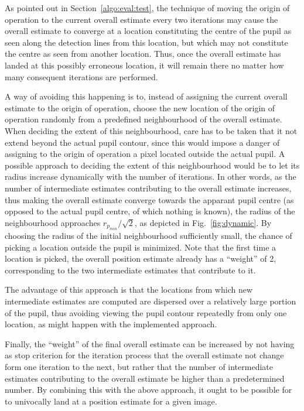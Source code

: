 As pointed out in Section~\ref{algo:eval:test}, the technique of
moving the origin of operation to the current overall estimate every
two iterations may cause the overall estimate to converge at a
location constituting the centre of the pupil as seen along the
detection lines from this location, but which may not constitute the
centre as seen from another location.  Thus, once the overall
estimate has landed at this possibly erroneous location, it will
remain there no matter how many consequent iterations are performed.

A way of avoiding this happening is to, instead of assigning the
current overall estimate to the origin of operation, choose the new
location of the origin of operation randomly from a predefined
neighbourhood of the overall estimate.  When deciding the extent of
this neighbourhood, care has to be taken that it not extend beyond the
actual pupil contour, since this would impose a danger of assigning to
the origin of operation a pixel located outside the actual pupil.  A
possible approach to deciding the extent of this neighbourhood would
be to let its radius increase dynamically with the number of
iterations.  In other words, as the number of intermediate estimates
contributing to the overall estimate increases, thus making the
overall estimate converge towards the apparant pupil centre (as
opposed to the actual pupil centre, of which nothing is known), the
radius of the neighbourhood approaches $r_{p_{min}}/\sqrt{2}$, as
depicted in Fig.~\ref{fig:dynamic}.  By choosing the radius of the
initial neighbourhood sufficiently small, the chance of picking a
location outside the pupil is minimized.  Note that the first time a
location is picked, the overall position estimate already has a
``weight'' of 2, corresponding to the two intermediate estimates that
contribute to it.

The advantage of this approach is that the locations from which new
intermediate estimates are computed are dispersed over a relatively
large portion of the pupil, thus avoiding viewing the pupil contour
repeatedly from only one location, as might happen with the
implemented approach.

Finally, the ``weight'' of the final overall estimate can be increased
by not having as stop criterion for the iteration process that the
overall estimate not change form one iteration to the next, but rather
that the number of intermediate estimates contributing to the overall
estimate be higher than a predetermined number.  By combining this
with the above approach, it ought to be possible for {\octopus} to
univocally land at a position estimate for a given image.

